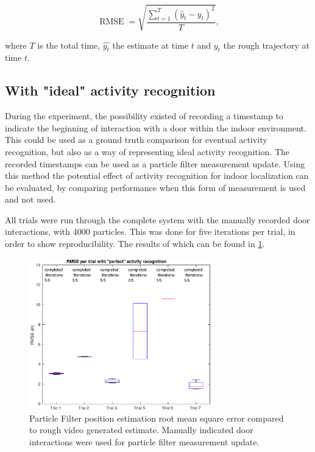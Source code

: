 \begin{equation}
	\displaystyle \operatorname {RMSE} ={\sqrt {\frac {\sum _{t=1}^{T}({\hat {y}}_{t}-y_{t})^{2}}{T}}},
	\label{eq:RMSE}
\end{equation}

where $T$ is the total time, $\hat{y_t}$ the estimate at time $t$ and $y_t$ the rough trajectory at time $t$.
\subsection{With "ideal" activity recognition}
During the experiment, the possibility existed of recording a timestamp to indicate the beginning of interaction with a door within the indoor environment. This could be used as a ground truth comparison for eventual activity recognition, but also as a way of representing ideal activity recognition. The recorded timestamps can be used as a particle filter measurement update. Using this method the potential effect of activity recognition for indoor localization can be evaluated, by comparing performance when this form of measurement is used and not used. \par 

All trials were run through the complete system with the manually recorded door interactions, with 4000 particles. This was done for five iterations per trial, in order to show reproducibility. The results of which can be found in \cref{fig:pf_boxplot}.

\begin{figure}[H]
	\centering
	\includegraphics[width=0.7\textwidth]{images/20201118_1212_RMSE_per_trial_with_perfect_activity_recognition}
	\caption[Particle Filter position estimation performance with manual door interaction]{Particle Filter position estimation root mean square error compared to rough video generated estimate. Manually indicated door interactions were used for particle filter measurement update.}	
	\label{fig:pf_boxplot}
\end{figure}

